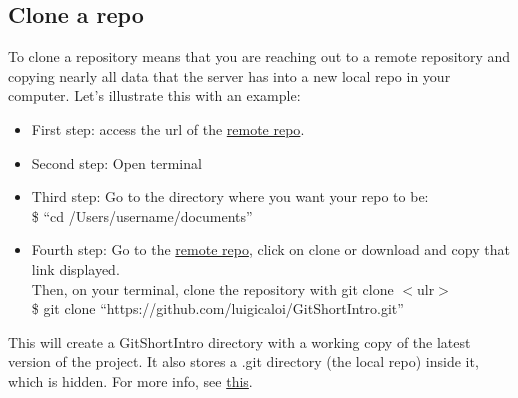 \documentclass{article}
\begin{document}
\subsection{Clone a repo}

    To clone a repository means that you are reaching out to a remote repository and copying nearly all data that the server has into a new local repo in your computer. Let's illustrate this with an example:
    \begin{itemize}
        \item First step: access the url of the \href{https://github.com/luigicaloi/GitShortIntro}{remote repo}.
        \item Second step: Open terminal
        \item Third step: Go to the directory where you want your repo to be: \\
        \newline
        \indent \$ ``cd /Users/username/documents''
        
        \item Fourth step: Go to the \href{https://github.com/luigicaloi/GitShortIntro}{remote repo}, click on clone or download and copy that link displayed. \\ 
        \newline 
        Then, on your terminal, clone the repository with git clone $<$ulr$>$   \\
        
        \indent \$ git clone  ``https://github.com/luigicaloi/GitShortIntro.git'' \\
    \end{itemize}
    This will create a GitShortIntro directory with a working copy of the latest version of the project. It also stores a .git directory (the local repo) inside it, which is hidden. For more info, see \href{https://help.github.com/articles/cloning-a-repository/}{this}.
    
\end{document}

